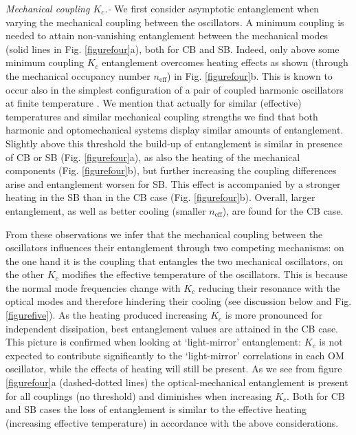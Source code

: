 \documentclass[a4paper]{jpconf}
\begin{document}
{\it Mechanical coupling $K_c$.-}  We first consider asymptotic entanglement when varying the mechanical
coupling between the
oscillators. A minimum  coupling is needed to
attain non-vanishing entanglement between the mechanical modes (solid
lines in Fig. \ref{figurefour}a), both for CB and SB. Indeed, only above some minimum coupling $K_c$  entanglement overcomes heating effects
as shown (through the mechanical occupancy number $n_{\mathrm{eff}}$) in Fig. \ref{figurefour}b. This is known to occur also
in the simplest configuration of a pair of coupled harmonic oscillators at finite temperature
\cite{anders,ent_fer}. We mention that actually for similar (effective) temperatures and similar mechanical coupling strengths we find that both harmonic and optomechanical
systems display similar amounts of entanglement.
Slightly above this threshold the build-up of entanglement
is similar in presence of CB or SB (Fig. \ref{figurefour}a), as also the heating of the mechanical components (Fig. \ref{figurefour}b),
but further increasing the coupling  differences arise
and entanglement worsen for SB. This effect is accompanied by a
stronger heating in the SB than in the CB case (Fig. \ref{figurefour}b). Overall, larger
entanglement, as well as better cooling  (smaller $n_{\mathrm{eff}}$), are found for
the CB case. 


From
these observations we infer that the mechanical coupling between the
oscillators influences their entanglement through two competing
mechanisms: on the one hand it is the coupling that entangles the two mechanical
oscillators, on the other $K_c$ modifies the effective temperature of the
oscillators. This is because the normal mode frequencies change with $K_c$ reducing their resonance with the optical modes
and therefore hindering their cooling (see discussion below and Fig. \ref{figurefive}). As the heating produced increasing $K_c$ is more
pronounced for
independent dissipation, best entanglement values are attained in the CB case.
This picture is confirmed when looking at ‘light-mirror’ entanglement:
$K_c$ is not expected to contribute significantly to the ‘light-mirror’ correlations in
each OM oscillator, while the effects of heating will still be present.
As we
see from figure \ref{figurefour}a (dashed-dotted lines)
the optical-mechanical entanglement is present for all couplings (no
threshold) and diminishes when increasing $K_c$. Both for CB and SB cases
the loss of entanglement is similar to the effective heating
(increasing effective temperature) in accordance with the above
considerations.
\end{document}

